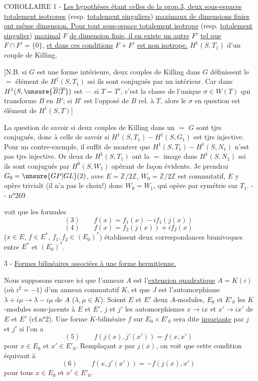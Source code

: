 COROLLAIRE 1 - \uline{Les hypothèses étant celles de la prop.3, deux sous-espaces totalement isotropes} (resp. \uline{totalement singuliers}) \uline{maximaux de dimensions finies ont même dimension. Pour tout sous-espace totalement isotrope} (resp. \uline{totalement singulier}) \uline{maximal} $F$ \uline{de dimension finie, il en existe un autre} $F'$ \uline{tel que} $F\cap F'=\{0\}$, \uline{et dans ces conditions} $F+F'$ \uline{est non isotrope.}
$H^1(S,T_1)$  d'un couple de Killing.

[N.B. si $G$ est une forme intérieure,  deux couples de Killing  dans $G$ définissent le $=$ élément de $H^1(S,T_1)$ ssi ils sont conjugués par un  intérieur. Car   dans $H^1(S,\unsure{\overline B|\overline T})$ est  --- si $T=T'$, c'est la classe  de l'unique $\sigma\in W(T)$ qui transforme $B$ en $B'$; si $B'$ est l'opposé de $B$ rel. à $T$, alors le $\sigma$ en question est     élément  de $H^1(S,T)$]


La question de savoir si deux couples de Killing dans un $=$ $G$ sont tjrs conjugués,  donc à celle de savoir si $H^1(S,T_1)\mathbin{-}H^1(S,G_1)$ est tjrs injective. Pour un contre-exemple, il suffit de montrer que $H^1(S,T_1)\mathbin{-}H^1(S,N_1)$ n'est pas tjrs injective. Or deux  de $H^1(S,T_1)$ ont la $=$ image dans $H^1(S,N_1)$ ssi ils sont conjugués par $H^0(S,W_1)$ opérant de façon évidente. Je prendrai  $G_0=\unsure{GP|GL}(2)$, avec $E=\mathbb Z/2\mathbb Z$, $W_0=\mathbb Z/2\mathbb Z$ est commutatif,  $E$ y opère trivialt (il n'a pas le choix!) donc $W_0=W_1$, qui opère par symétrie sur $T_1$.
-  -
\hfill n°269

voit que les formules
\[
(3)\qquad f(x)=f_1(x)-if_1(j(x))
\]
\[
(4)\qquad f(x)=f_2(j(x))+if_2(x)
\]
($x\in E$, $f\in E^*$, $f_1,f_2\in(E_0)^*$) établissent deux correspondances biunivoques entre $E^*$ et $(E_0)^*$.

3 - \uline{Formes bilinéaires associées à une forme hermitienne.}

Nous supposons encore ici que l'anneau $A$ est l'\uline{extension quadratique} $A=K(i)$ (où $i^2=-1$) d'un anneau commutatif $K$, et que $J$ est l'automorphisme $\lambda+i\mu\longrightarrow\lambda-i\mu$ de $A$ ($\lambda,\mu\in K$). Soient $E$ et $E'$ deux $A$-modules, $E_0$ et $E'_0$ les $K$-modules sous-jacents à $E$ et $E'$, $j$ et $j'$ les automorphismes $x\longrightarrow ix$ et $x'\longrightarrow ix'$ de $E$ et $E'$ (cf.n°2). Une forme $K$-bilinéaire $f$ sur $E_0\times E'_0$ sera dite \uline{invariante} par $j$ et $j'$ si l'on a
\[
(5)\qquad f(j(x),j'(x'))=f(x,x')
\]
pour $x\in E_0$ et $x'\in E'_0$. Remplaçant $x$ par $j(x)$, on voit que cette condition équivaut à
\[
(6)\qquad f(x,j'(x'))=-f(j(x),x')
\]
pour tous $x\in E_0$ et $x'\in E'_0$.

